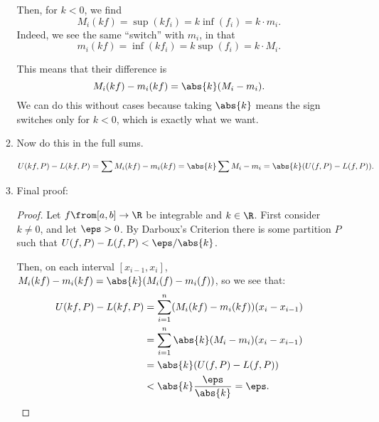 \documentclass{article}
\begin{document}
\begin{enumerate}
\begin{enumerate}
                Then, for \underline{$k < 0$}, we find
                \[ M_{i}(kf) = \sup(kf_{i}) = k\inf(f_{i}) = k \cdot m_{i}. \]
                Indeed, we see the same ``switch'' with $m_{i}$, in that
                \[ m_{i}(kf) = \inf(kf_{i}) = k\sup(f_{i}) = k \cdot M_{i}. \]

                This means that their difference is
                \[ M_{i}(kf) - m_{i}(kf) = \abs{k}(M_{i} - m_{i}). \]
                We can do this without cases because taking $\abs{k}$ means
                the sign switches only for $k < 0$, which is exactly what we want.

          \item Now do this in the full sums.

                \[ U(kf, P) - L(kf, P) = \sum M_{i}(kf) - m_{i}(kf) = \abs{k} \sum M_{i} - m_{i} = \abs{k}(U(f, P) - L(f, P)).  \]

          \item Final proof:

                \begin{proof}
                  Let $f \from [a, b] \to \R$ be integrable and $k \in \R$. First consider $k \ne 0$, and let $\eps > 0$.
                  By Darboux's Criterion there is some partition $P$ such that $U(f, P) - L(f, P) < \eps/\abs{k}$.

                  Then, on each interval $[x_{i - 1}, x_{i}]$, $M_{i}(kf) - m_{i}(kf) = \abs{k}(M_{i}(f) - m_{i}(f))$, so we see that:
                  \begin{align*}
                    U(kf, P) - L(kf, P) &= \sum_{i = 1}^{n} (M_{i}(kf) - m_{i}(kf))(x_{i} - x_{i - 1})\\
                    &= \sum_{i = 1}^{n} \abs{k}(M_{i} - m_{i})(x_{i} - x_{i - 1})\\
                    &= \abs{k}(U(f, P) - L(f, P))\\
                    &< \abs{k}\frac{\eps}{\abs{k}} = \eps.
                  \end{align*}
                \end{proof}

        \end{enumerate}

\end{enumerate}
\end{document}
